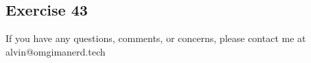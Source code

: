 \documentclass[letterpaper, 12pt]{math}
\begin{document}
\subsection*{Exercise 43}

\begin{center}
  If you have any questions, comments, or concerns, please contact me at
  alvin@omgimanerd.tech
\end{center}
\end{document}
